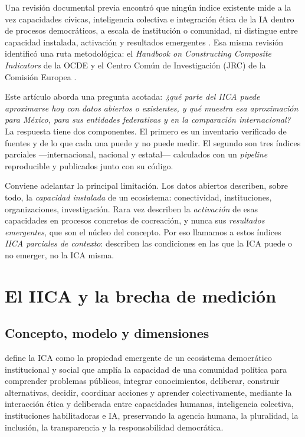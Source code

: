 \documentclass[11pt,a4paper]{article}
\begin{document}
Una revisión documental previa encontró que ningún índice existente mide a la vez capacidades cívicas, inteligencia colectiva e integración ética de la IA dentro de procesos democráticos, a escala de institución o comunidad, ni distingue entre capacidad instalada, activación y resultados emergentes \parencite{informe_ica_2026}. Esa misma revisión identificó una ruta metodológica: el \emph{Handbook on Constructing Composite Indicators} de la OCDE y el Centro Común de Investigación (JRC) de la Comisión Europea \parencite{ocde_jrc_2008,jrc_coin_2019}.

Este artículo aborda una pregunta acotada: \emph{¿qué parte del IICA puede aproximarse hoy con datos abiertos o existentes, y qué muestra esa aproximación para México, para sus entidades federativas y en la comparación internacional?} La respuesta tiene dos componentes. El primero es un inventario verificado de fuentes y de lo que cada una puede y no puede medir. El segundo son tres índices parciales ---internacional, nacional y estatal--- calculados con un \emph{pipeline} reproducible y publicados junto con su código.

Conviene adelantar la principal limitación. Los datos abiertos describen, sobre todo, la \emph{capacidad instalada} de un ecosistema: conectividad, instituciones, organizaciones, investigación. Rara vez describen la \emph{activación} de esas capacidades en procesos concretos de cocreación, y nunca sus \emph{resultados emergentes}, que son el núcleo del concepto. Por eso llamamos a estos índices \emph{IICA parciales de contexto}: describen las condiciones en las que la ICA puede o no emerger, no la ICA misma.

\section{El IICA y la brecha de medición}

\subsection{Concepto, modelo y dimensiones}

\textcite{zenteno_ica_2026} define la ICA como la propiedad emergente de un ecosistema democrático institucional y social que amplía la capacidad de una comunidad política para comprender problemas públicos, integrar conocimientos, deliberar, construir alternativas, decidir, coordinar acciones y aprender colectivamente, mediante la interacción ética y deliberada entre capacidades humanas, inteligencia colectiva, instituciones habilitadoras e IA, preservando la agencia humana, la pluralidad, la inclusión, la transparencia y la responsabilidad democrática.
\end{document}
